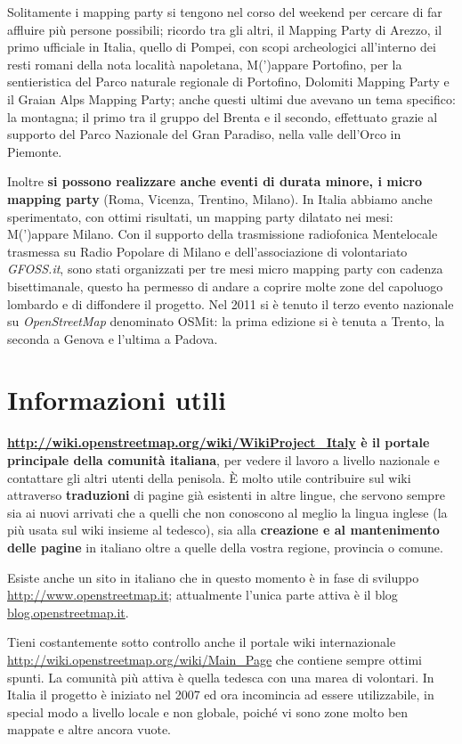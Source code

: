 \documentclass[a4paper,twoside,12pt,]{article}
\newcommand{\osm}{\emph{OpenStreetMap}\xspace}
\newcommand{\pro}[1]{\emph{#1}}
\begin{document}
Solitamente i mapping party si tengono nel corso del weekend per cercare di far affluire più persone possibili; ricordo tra gli altri, il Mapping Party di Arezzo, il primo ufficiale in Italia, quello di Pompei, con scopi archeologici all'interno dei resti romani della nota località napoletana, M(')appare Portofino, per la sentieristica del Parco naturale regionale di Portofino, Dolomiti Mapping Party e il Graian Alps Mapping Party; anche questi ultimi due avevano un tema specifico: la montagna; il primo tra il gruppo del Brenta e il secondo, effettuato grazie al supporto del Parco Nazionale del Gran Paradiso, nella valle dell'Orco in Piemonte.

Inoltre \textbf{si possono realizzare anche eventi di durata minore, i micro mapping party} (Roma, Vicenza, Trentino, Milano). In Italia abbiamo anche sperimentato, con ottimi risultati, un mapping party dilatato nei mesi: M(')appare Milano. Con il supporto della trasmissione radiofonica Mentelocale trasmessa su Radio Popolare di Milano e dell'associazione di volontariato \pro{GFOSS.it}, sono stati organizzati per tre mesi micro mapping party con cadenza bisettimanale, questo ha permesso di andare a coprire molte zone del capoluogo lombardo e di diffondere il progetto. Nel 2011 si è tenuto il terzo evento nazionale su \osm denominato OSMit: la prima edizione si è tenuta a Trento, la seconda a Genova e l'ultima a Padova.

\section{Informazioni utili}
\textbf{\url{http://wiki.openstreetmap.org/wiki/WikiProject_Italy} è il portale principale della comunità italiana}, per vedere il lavoro a livello nazionale e contattare gli altri utenti della penisola. È molto utile contribuire sul wiki attraverso \textbf{traduzioni} di pagine già esistenti in altre lingue, che servono sempre sia ai nuovi arrivati che a quelli che non conoscono al meglio la lingua inglese (la più usata sul wiki insieme al tedesco), sia alla \textbf{creazione e al mantenimento delle pagine} in italiano oltre a quelle della vostra regione, provincia o comune.

Esiste anche un sito in italiano che in questo momento è in fase di sviluppo \url{http://www.openstreetmap.it}; attualmente l'unica parte attiva è il blog \url{blog.openstreetmap.it}.

Tieni costantemente sotto controllo anche il portale wiki internazionale \url{http://wiki.openstreetmap.org/wiki/Main_Page} che contiene sempre ottimi spunti.  La comunità più attiva è quella tedesca con una marea di volontari. In Italia il progetto è iniziato nel 2007 ed ora incomincia ad essere utilizzabile, in special modo a livello locale e non globale, poiché vi sono zone molto ben mappate e altre ancora vuote.
\end{document}
